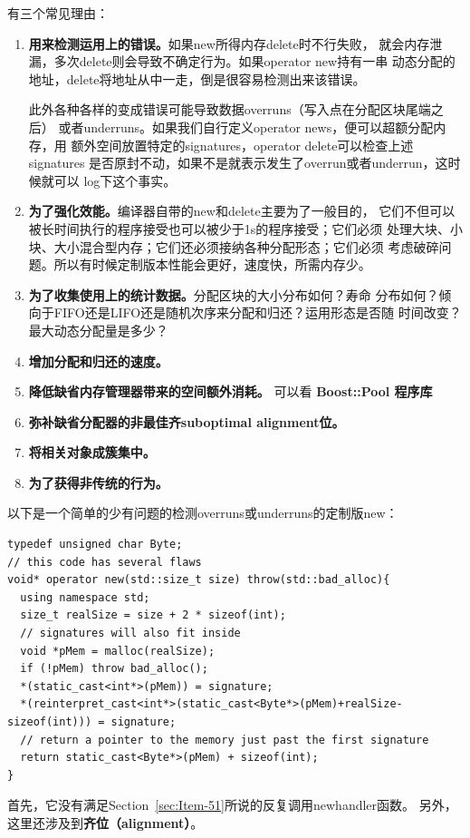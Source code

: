 有三个常见理由：
\begin{enumerate}
\item \textbf{用来检测运用上的错误。}如果new所得内存delete时不行失败，
  就会内存泄漏，多次delete则会导致不确定行为。如果operator new持有一串
  动态分配的地址，delete将地址从中一走，倒是很容易检测出来该错误。

  此外各种各样的变成错误可能导致数据overruns（写入点在分配区块尾端之后）
  或者underruns。如果我们自行定义operator news，便可以超额分配内存，用
  额外空间放置特定的signatures，operator delete可以检查上述signatures
  是否原封不动，如果不是就表示发生了overrun或者underrun，这时候就可以
  log下这个事实。
\item \textbf{为了强化效能。}编译器自带的new和delete主要为了一般目的，
  它们不但可以被长时间执行的程序接受也可以被少于1s的程序接受；它们必须
  处理大块、小块、大小混合型内存；它们还必须接纳各种分配形态；它们必须
  考虑破碎问题。所以有时候定制版本性能会更好，速度快，所需内存少。
\item \textbf{为了收集使用上的统计数据。}分配区块的大小分布如何？寿命
  分布如何？倾向于FIFO还是LIFO还是随机次序来分配和归还？运用形态是否随
  时间改变？最大动态分配量是多少？
\item \textbf{增加分配和归还的速度。}
\item \textbf{降低缺省内存管理器带来的空间额外消耗。} 可以看
  \textbf{Boost::Pool 程序库}
\item \textbf{弥补缺省分配器的非最佳齐suboptimal alignment位。}
\item \textbf{将相关对象成簇集中。}
\item \textbf{为了获得非传统的行为。}
\end{enumerate}

以下是一个简单的少有问题的检测overruns或underruns的定制版new：
\begin{verbatim}
typedef unsigned char Byte;
// this code has several flaws
void* operator new(std::size_t size) throw(std::bad_alloc){
  using namespace std;
  size_t realSize = size + 2 * sizeof(int); 
  // signatures will also fit inside
  void *pMem = malloc(realSize); 
  if (!pMem) throw bad_alloc(); 
  *(static_cast<int*>(pMem)) = signature;
  *(reinterpret_cast<int*>(static_cast<Byte*>(pMem)+realSize-sizeof(int))) = signature;
  // return a pointer to the memory just past the first signature
  return static_cast<Byte*>(pMem) + sizeof(int);
}
\end{verbatim}

首先，它没有满足Section~\ref{sec:Item-51}所说的反复调用newhandler函数。
另外，这里还涉及到\textbf{齐位（alignment）}。


